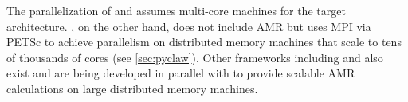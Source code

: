 The parallelization of \amrclaw and \geoclaw assumes multi-core machines for the target architecture.  \pyclaw, on the other hand, does not include AMR but uses MPI via
PETSc to achieve parallelism on distributed memory machines that scale to tens of
thousands of cores (see \cref{sec:pyclaw}).
Other frameworks including
\forestclaw \cite{Burstedde:we} and \boxlib {} also
exist and are being developed in parallel with \amrclaw to provide scalable
AMR calculations on large distributed memory machines.

